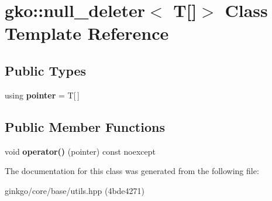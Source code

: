 \hypertarget{classgko_1_1null__deleter_3_01T[]_4}{}\section{gko\+:\+:null\+\_\+deleter$<$ T\mbox{[}\mbox{]}$>$ Class Template Reference}
\label{classgko_1_1null__deleter_3_01T[]_4}
\subsection*{Public Types}
\begin{DoxyCompactItemize}
\item 
\mbox{\label{classgko_1_1null__deleter_3_01T[]_4_a327915073992d00be1ff71150c2792b3}} 
using {\bfseries pointer} = T\mbox{[}$\,$\mbox{]}
\end{DoxyCompactItemize}
\subsection*{Public Member Functions}
\begin{DoxyCompactItemize}
\item 
\mbox{\label{classgko_1_1null__deleter_3_01T[]_4_abce6b34c72d1cb5984b1809787f73012}} 
void {\bfseries operator()} (pointer) const noexcept
\end{DoxyCompactItemize}


The documentation for this class was generated from the following file\+:\begin{DoxyCompactItemize}
\item 
ginkgo/core/base/utils.\+hpp (4bde4271)\end{DoxyCompactItemize}
